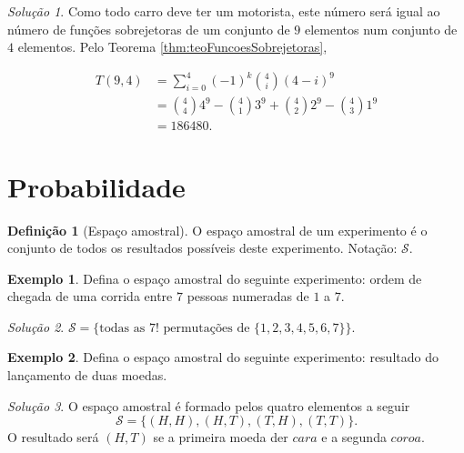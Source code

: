 \documentclass[]{book}
\theoremstyle{definition}
\newtheorem{definition}{Definição}[chapter]
\theoremstyle{definition}
\newtheorem{example}{Exemplo}[chapter]
\theoremstyle{definition}
\theoremstyle{remark}
\newtheorem*{solution}{Solução}
\begin{document}
\begin{solution}
\iffalse{} {Solução. } \fi{}Como todo carro deve ter um motorista, este número será igual ao número de funções sobrejetoras de um conjunto de \(9\) elementos num conjunto de \(4\) elementos.
Pelo Teorema \ref{thm:teoFuncoesSobrejetoras},

\begin{align}
T(9,4) &= \sum_{i=0}^{4}(-1)^k{4 \choose i}(4-i)^9 \\
&= {4 \choose 4} 4^9 - {4 \choose 1} 3^9 + {4 \choose 2} 2^9- {4 \choose 3} 1^9\\
&= 186480.
\end{align}
\end{solution}

\hypertarget{probabilidade}{%
\section{Probabilidade}\label{probabilidade}}

\begin{definition}[Espaço amostral]
\protect\hypertarget{def:defEspAmostral}{}{\label{def:defEspAmostral} \iffalse (Espaço amostral) \fi{} }O espaço amostral de um experimento é o conjunto de todos os resultados possíveis deste experimento.
Notação: \(\mathcal{S}.\)
\end{definition}

\begin{example}
\protect\hypertarget{exm:exCorrida}{}{\label{exm:exCorrida} }Defina o espaço amostral do seguinte experimento: ordem de chegada de uma corrida entre \(7\) pessoas numeradas de \(1\) a \(7\).
\end{example}

\begin{solution}
\iffalse{} {Solução. } \fi{}\(\mathcal{S}=\{\text{todas as $7!$ permutações de $\{1,2,3,4,5,6,7\}$}\}.\)
\end{solution}

\begin{example}
\protect\hypertarget{exm:exDuasMoedas}{}{\label{exm:exDuasMoedas} }Defina o espaço amostral do seguinte experimento: resultado do lançamento de duas moedas.
\end{example}

\begin{solution}
\iffalse{} {Solução. } \fi{}O espaço amostral é formado pelos quatro elementos a seguir
\[\mathcal{S}=\{(H,H),(H,T),(T,H),(T,T)\}.\]
O resultado será \((H,T)\) se a primeira moeda der \(cara\) e a segunda \(coroa\).
\end{solution}
\end{document}

